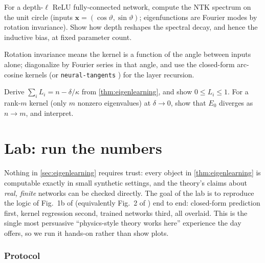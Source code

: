 \documentclass[11pt]{article}
\newcommand{\bv}[1]{\boldsymbol{#1}}
\begin{document}
\begin{exercise}
\label{ex:ntk-circle}
\important
For a depth-$\ell$ ReLU fully-connected network, compute the NTK spectrum on
the unit circle (inputs $\bv{x} = (\cos\vartheta,\sin\vartheta)$;
eigenfunctions are Fourier modes by rotation invariance). Show how depth
reshapes the spectral decay, and hence the inductive bias, at fixed
parameter count.
\end{exercise}

\begin{hint}
Rotation invariance means the kernel is a function of the angle between
inputs alone; diagonalize by Fourier series in that angle, and use the
closed-form arc-cosine kernels (or \texttt{neural-tangents}
\cite{novak2020neural}) for the layer recursion.
\end{hint}

\begin{exercise}
\label{ex:conservation}
Derive $\sum_i L_i = n - \delta/\kappa$ from \cref{thm:eigenlearning}, and
show $0 \le L_i \le 1$. For a rank-$m$ kernel (only $m$ nonzero
eigenvalues) at $\delta \to 0$, show that $E_0$ diverges as $n \to m$, and
interpret.
\end{exercise}

\section{Lab: run the numbers}
\label{sec:lab}

Nothing in \cref{sec:eigenlearning} requires trust: every object in
\cref{thm:eigenlearning} is computable exactly in small synthetic settings,
and the theory's claims about \emph{real, finite} networks can be checked
directly. The goal of the lab is to reproduce the logic of Fig.~1b of
\cite{simon2026scientific} (equivalently Fig.~2 of
\cite{simon2023eigenlearning}) end to end: closed-form prediction first,
kernel regression second, trained networks third, all overlaid. This is the
single most persuasive ``physics-style theory works here'' experience the
day offers, so we run it hands-on rather than show plots.

\subsubsection*{Protocol}
\end{document}
